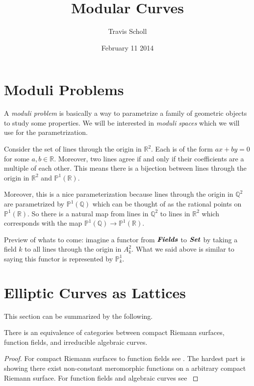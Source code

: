 \documentclass[11pt]{article}
\date{February 11 2014}
\newcommand{\BB}[1]{\mathbb{#1}} %
\newcommand{\cat}[1]{\textbf{\emph{#1}}} %
\newcommand{\RR}{\BB{R}}
\newcommand{\QQ}{\BB{Q}}
\newcommand{\PP}{\BB{P}}
\theoremstyle{plain}
\theoremstyle{remark}
\newcommand{\mytitle}{Modular Curves}
\newcommand{\myauthor}{Travis Scholl}
\begin{document}
\title{\bfseries \mytitle}
\author{\sc \myauthor }
\maketitle

\section{Moduli Problems}

A \emph{moduli problem} is basically a way to parametrize a family of geometric objects to study some properties. We will be interested in \emph{moduli spaces} which we will use for the parametrization.

\begin{ex}\label{lineparam}
Consider the set of lines through the origin in $\RR^2$. Each is of the form $ax+by=0$ for some $a,b\in\RR$. Moreover, two lines agree if and only if their coefficients are a multiple of each other. This means there is a bijection between lines through the origin in $\RR^2$ and $\PP^1(\RR)$.

Moreover, this is a nice parameterization because lines through the origin in $\QQ^2$ are parametrized by $\PP^1(\QQ)$ which can be thought of as the rational points on $\PP^1(\RR)$. So there is a natural map from lines in $\QQ^2$ to lines in $\RR^2$ which corresponds with the map $\PP^1(\QQ) \to \PP^1(\RR)$.

Preview of whats to come: imagine a functor from $\cat{Fields}$ to $\cat{Set}$ by taking a field $k$ to all lines through the origin in $A^2_k$. What we said above is similar to saying this functor is represented by $\PP^1_k$.
\end{ex}

\section{Elliptic Curves as Lattices}

This section can be summarized by the following.
\begin{thm}
	There is an equivalence of categories between compact Riemann surfaces, function fields, and irreducible algebraic curves.
\end{thm}
\begin{proof}
	For compact Riemann surfaces to function fields see \cite[Chapter 1 Section 3 Proposition 1.95]{dessins}. The hardest part is showing there exist non-constant meromorphic functions on a arbitrary compact Riemann surface. For function fields and algebraic curves see \cite[Chapter 1 Section 6 Corollary 6.12]{hartshorne}
\end{proof}
\end{document}
